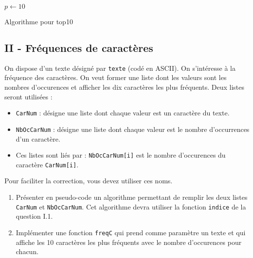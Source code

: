 \begin{enumerate}
\begin{algorithm}
  $p\leftarrow 10$\;
  \caption{Algorithme pour top10}
  \label{Efreqtexte_1}
\end{algorithm}
\end{enumerate}
\subsection*{II - Fréquences de caractères}
On dispose d'un texte désigné par \verb|texte| (codé en ASCII). On s'intéresse à la fréquence des caractères. On veut former une liste dont les valeurs sont les nombres d'occurences et afficher les dix caractères les plus fréquents.\newline
Deux listes seront utilisées :
\begin{itemize}
  \item \verb|CarNum| : désigne une liste dont chaque valeur est un caractère du texte.
  \item \verb|NbOcCarNum| : désigne une liste dont chaque valeur est le nombre d'occurrences d'un caractère.
  \item Ces listes sont liés par : \verb|NbOcCarNum[i]| est le nombre d'occurences du caractère \verb|CarNum[i]|.
\end{itemize}
Pour faciliter la correction, vous devez utiliser ces noms.
\begin{enumerate}
  \item Présenter en pseudo-code un algorithme permettant de remplir les deux listes \verb|CarNum| et \verb|NbOcCarNum|. Cet algorithme devra utiliser la fonction \verb|indice| de la question I.1.
  \item Implémenter une fonction \verb|freqC| qui prend comme paramètre un texte et qui affiche les 10 caractères les plus fréquents avec le nombre d'occurences pour chacun. 
\end{enumerate}

